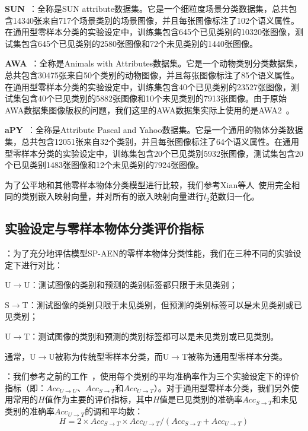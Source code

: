 \textbf{SUN}~\cite{patterson2012sun}：全称是SUN attribute数据集。它是一个细粒度场景分类数据集，总共包含14340张来自717个场景类别的场景图像，并且每张图像标注了102个语义属性。在通用型零样本分类的实验设定中，训练集包含645个已见类别的10320张图像，测试集包含645个已见类别的2580张图像和72个未见类别的1440张图像。

\textbf{AWA}~\cite{lampert2009learning}：全称是Animals with Attributes数据集。它是一个动物类别分类数据集，总共包含30475张来自50个类别的动物图像，并且每张图像标注了85个语义属性。在通用型零样本分类的实验设定中，训练集包含40个已见类别的23527张图像，测试集包含40个已见类别的5882张图像和10个未见类别的7913张图像。由于原始AWA数据集图像版权的问题，我们这里的AWA数据集实际上使用的是AWA2~\cite{xian2017zero,xian2018zero}。

\textbf{aPY}~\cite{farhadi2009describing}：全称是Attribute Pascal and Yahoo数据集。它是一个通用的物体分类数据集，总共包含12051张来自32个类别，并且每张图像标注了64个语义属性。在通用型零样本分类的实验设定中，训练集包含20个已见类别5932张图像，测试集包含20个已见类别1483张图像和12个未见类别的7924张图像。

为了公平地和其他零样本物体分类模型进行比较，我们参考Xian等人~\cite{xian2017zero}使用完全相同的类别嵌入映射向量，并对所有的嵌入映射向量进行$l_2$范数归一化。


\subsection{实验设定与零样本物体分类评价指标}
\textbf{}：为了充分地评估模型SP-AEN的零样本物体分类性能，我们在三种不同的实验设定下进行对比：
\begin{asparaenum}
\item U$\to$U：测试图像的类别和预测的类别标签都只限于未见类别；

\item S$\to$T：测试图像的类别只限于未见类别，但预测的类别标签可以是未见类别或已见类别；

\item U$\to$T：测试图像的类别和预测的类别标签都可以是未见类别或已见类别。
\end{asparaenum}
通常，U$\to$U被称为传统型零样本分类，而U$\to$T被称为通用型零样本分类。

\textbf{}：我们参考之前的工作~\cite{xian2017zero}，使用每个类别的平均准确率作为三个实验设定下的评价指标（即：$Acc_{U\rightarrow U}$、$Acc_{S\rightarrow T}$和$Acc_{U\rightarrow T}$）。对于通用型零样本分类，我们另外使用常用的$H$值作为主要的评价指标，其中$H$值是已见类别的准确率$Acc_{S\rightarrow T}$和未见类别的准确率$Acc_{U\rightarrow T}$的调和平均数：
\begin{equation} \label{ch3:eq:eq_7}
H = 2\times Acc_{S\rightarrow T}\times Acc_{U\rightarrow T} /(Acc_{S\rightarrow T}+Acc_{U\rightarrow T})
\end{equation}

